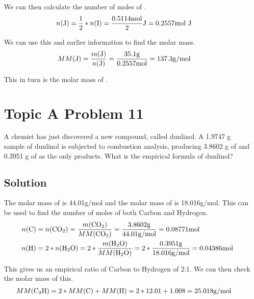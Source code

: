 \documentclass[10pt]{article}
\begin{document}
            We can then calculate the number of moles of .
            \begin{align}
                n(\ce{J})   &=  \frac{1}{2} * n(\ce{I})
                    =   \frac{0.5114\unit{\mole}}{2} \ce{J}
                    =   0.2557 \unit{\mole}\ \ce{J}
            \end{align}

            We can use this and earlier information to find the molar mass.
            \begin{align}
                MM(\ce{J})  &=  \frac{m(\ce{J})}{n(\ce{J})}
                    =   \frac{35.1 \unit{\gram}}{0.2557 \unit{\mole}}
                    =   137.3 \unit{\gram/\mole}
            \end{align}

            This in turn is the molar mass of .

    \pagebreak
    \section{Topic A Problem 11}
        A chemist has just discovered a new compound, called dunlinol. 
        A 1.9747 g sample of dunlinol is subjected to combustion analysis, producing 3.8602 g of  and 0.3951 g of  as the only products. 
        What is the empirical formula of dunlinol?

        \subsection{Solution}
            The molar mass of  is 44.01\unit{\gram/\mole} and the molar mass of  is 18.016\unit{\gram/\mole}.
            This can be used to find the number of moles of both Carbon and Hydrogen.
            \begin{align}
                n(\ce{C})   &=  n(\ce{CO2})
                    =   \frac{m(\ce{CO2})}{MM(\ce{CO2})}
                    =   \frac{3.8602 \unit{\gram}}{44.01 \unit{\gram/\mole}}
                    =   0.08771 \unit{\mole}\\
                n(\ce{H})   &=  2 * n(\ce{H2O})
                    =   2 * \frac{m(\ce{H2O})}{MM(\ce{H2O})}
                    =   2 * \frac{0.3951 \unit{\gram}}{18.016 \unit{\gram/\mole}}
                    =   0.04386 \unit{\mole}
            \end{align}

            This gives us an empirical ratio of Carbon to Hydrogen of 2:1.
            We can then check the molar mass of this.
            \begin{align}
                MM(\ce{C2H})    &=  2 * MM(\ce{C}) + MM(\ce{H})
                    =   2 * 12.01 + 1.008
                    =   25.018 \unit{\gram/\mole}
            \end{align}
\end{document}
